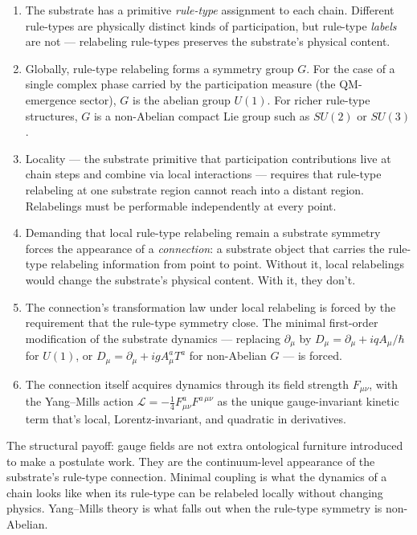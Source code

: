 \documentclass[11pt,a4paper]{article}
\begin{document}
\begin{enumerate}[noitemsep]
  \item The substrate has a primitive \emph{rule-type} assignment to each chain. Different rule-types are physically distinct kinds of participation, but rule-type \emph{labels} are not --- relabeling rule-types preserves the substrate's physical content.
  \item Globally, rule-type relabeling forms a symmetry group $G$. For the case of a single complex phase carried by the participation measure (the QM-emergence sector), $G$ is the abelian group $U(1)$. For richer rule-type structures, $G$ is a non-Abelian compact Lie group such as $SU(2)$ or $SU(3)$.
  \item Locality --- the substrate primitive that participation contributions live at chain steps and combine via local interactions --- requires that rule-type relabeling at one substrate region cannot reach into a distant region. Relabelings must be performable independently at every point.
  \item Demanding that local rule-type relabeling remain a substrate symmetry forces the appearance of a \emph{connection}: a substrate object that carries the rule-type relabeling information from point to point. Without it, local relabelings would change the substrate's physical content. With it, they don't.
  \item The connection's transformation law under local relabeling is forced by the requirement that the rule-type symmetry close. The minimal first-order modification of the substrate dynamics --- replacing $\partial_\mu$ by $D_\mu = \partial_\mu + iqA_\mu/\hbar$ for $U(1)$, or $D_\mu = \partial_\mu + igA_\mu^a T^a$ for non-Abelian $G$ --- is forced.
  \item The connection itself acquires dynamics through its field strength $F_{\mu\nu}$, with the Yang--Mills action $\mathcal{L} = -\tfrac{1}{4}F_{\mu\nu}^a F^{a\,\mu\nu}$ as the unique gauge-invariant kinetic term that's local, Lorentz-invariant, and quadratic in derivatives.
\end{enumerate}

The structural payoff: gauge fields are not extra ontological furniture introduced to make a postulate work. They are the continuum-level appearance of the substrate's rule-type connection. Minimal coupling is what the dynamics of a chain looks like when its rule-type can be relabeled locally without changing physics. Yang--Mills theory is what falls out when the rule-type symmetry is non-Abelian.
\end{document}
